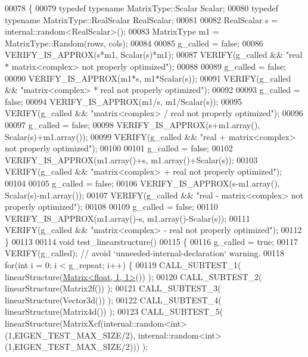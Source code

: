 \begin{DoxyCode}
00078 \{
00079   \textcolor{keyword}{typedef} \textcolor{keyword}{typename} MatrixType::Scalar Scalar;
00080   \textcolor{keyword}{typedef} \textcolor{keyword}{typename} MatrixType::RealScalar RealScalar;
00081   
00082   RealScalar s = internal::random<RealScalar>();
00083   MatrixType m1 = MatrixType::Random(rows, cols);
00084   
00085   g\_called = \textcolor{keyword}{false};
00086   VERIFY\_IS\_APPROX(s*m1, Scalar(s)*m1);
00087   VERIFY(g\_called && \textcolor{stringliteral}{"real * matrix<complex> not properly optimized"});
00088   
00089   g\_called = \textcolor{keyword}{false};
00090   VERIFY\_IS\_APPROX(m1*s, m1*Scalar(s));
00091   VERIFY(g\_called && \textcolor{stringliteral}{"matrix<complex> * real not properly optimized"});
00092   
00093   g\_called = \textcolor{keyword}{false};
00094   VERIFY\_IS\_APPROX(m1/s, m1/Scalar(s));
00095   VERIFY(g\_called && \textcolor{stringliteral}{"matrix<complex> / real not properly optimized"});
00096 
00097   g\_called = \textcolor{keyword}{false};
00098   VERIFY\_IS\_APPROX(s+m1.array(), Scalar(s)+m1.array());
00099   VERIFY(g\_called && \textcolor{stringliteral}{"real + matrix<complex> not properly optimized"});
00100 
00101   g\_called = \textcolor{keyword}{false};
00102   VERIFY\_IS\_APPROX(m1.array()+s, m1.array()+Scalar(s));
00103   VERIFY(g\_called && \textcolor{stringliteral}{"matrix<complex> + real not properly optimized"});
00104 
00105   g\_called = \textcolor{keyword}{false};
00106   VERIFY\_IS\_APPROX(s-m1.array(), Scalar(s)-m1.array());
00107   VERIFY(g\_called && \textcolor{stringliteral}{"real - matrix<complex> not properly optimized"});
00108 
00109   g\_called = \textcolor{keyword}{false};
00110   VERIFY\_IS\_APPROX(m1.array()-s, m1.array()-Scalar(s));
00111   VERIFY(g\_called && \textcolor{stringliteral}{"matrix<complex> - real not properly optimized"});
00112 \}
00113 
00114 \textcolor{keywordtype}{void} test\_linearstructure()
00115 \{
00116   g\_called = \textcolor{keyword}{true};
00117   VERIFY(g\_called); \textcolor{comment}{// avoid `unneeded-internal-declaration` warning.}
00118   \textcolor{keywordflow}{for}(\textcolor{keywordtype}{int} i = 0; i < g\_repeat; i++) \{
00119     CALL\_SUBTEST\_1( linearStructure(\hyperlink{group___core___module_class_eigen_1_1_matrix}{Matrix<float, 1, 1>}()) );
00120     CALL\_SUBTEST\_2( linearStructure(Matrix2f()) );
00121     CALL\_SUBTEST\_3( linearStructure(Vector3d()) );
00122     CALL\_SUBTEST\_4( linearStructure(Matrix4d()) );
00123     CALL\_SUBTEST\_5( linearStructure(MatrixXcf(internal::random<int>(1,EIGEN\_TEST\_MAX\_SIZE/2), 
      internal::random<int>(1,EIGEN\_TEST\_MAX\_SIZE/2))) );

\end{DoxyCode}
